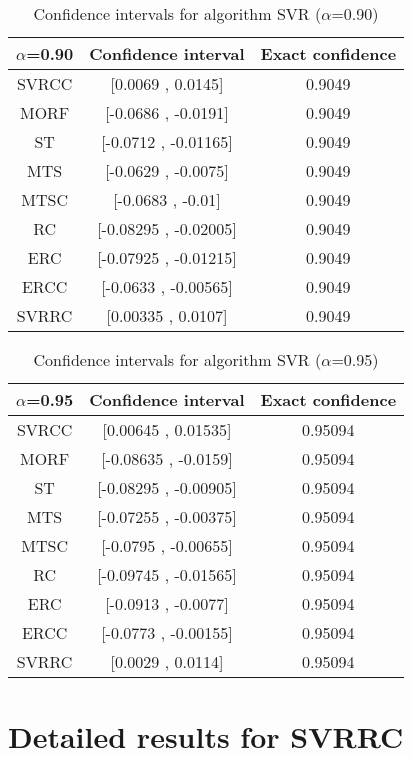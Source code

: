 \documentclass[a4paper,10pt]{article}
\begin{document}
\begin{table}[!htp]
\centering\small
\begin{tabular}{
|c|c|c|}
\hline
 $\alpha$=0.90 & Confidence interval & Exact confidence \\ \hline 
SVRCC & [0.0069 , 0.0145] & 0.9049\\ \hline 
MORF & [-0.0686 , -0.0191] & 0.9049\\ \hline 
ST & [-0.0712 , -0.01165] & 0.9049\\ \hline 
MTS & [-0.0629 , -0.0075] & 0.9049\\ \hline 
MTSC & [-0.0683 , -0.01] & 0.9049\\ \hline 
RC & [-0.08295 , -0.02005] & 0.9049\\ \hline 
ERC & [-0.07925 , -0.01215] & 0.9049\\ \hline 
ERCC & [-0.0633 , -0.00565] & 0.9049\\ \hline 
SVRRC & [0.00335 , 0.0107] & 0.9049\\ \hline 

\end{tabular}
\caption{Confidence intervals for algorithm SVR ($\alpha$=0.90)}
\end{table}
\begin{table}[!htp]
\centering\small
\begin{tabular}{
|c|c|c|}
\hline
 $\alpha$=0.95 & Confidence interval & Exact confidence \\ \hline 
SVRCC & [0.00645 , 0.01535] & 0.95094\\ \hline 
MORF & [-0.08635 , -0.0159] & 0.95094\\ \hline 
ST & [-0.08295 , -0.00905] & 0.95094\\ \hline 
MTS & [-0.07255 , -0.00375] & 0.95094\\ \hline 
MTSC & [-0.0795 , -0.00655] & 0.95094\\ \hline 
RC & [-0.09745 , -0.01565] & 0.95094\\ \hline 
ERC & [-0.0913 , -0.0077] & 0.95094\\ \hline 
ERCC & [-0.0773 , -0.00155] & 0.95094\\ \hline 
SVRRC & [0.0029 , 0.0114] & 0.95094\\ \hline 

\end{tabular}
\caption{Confidence intervals for algorithm SVR ($\alpha$=0.95)}
\end{table}

 \clearpage 


\section{Detailed results for SVRRC}
\end{document}
